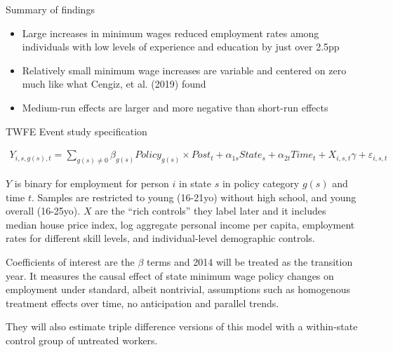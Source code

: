 \documentclass{beamer}
\begin{document}
\begin{frame}{Summary of findings}

\begin{itemize}
\item Large increases in minimum wages reduced employment rates among individuals with low levels of experience and education by just over 2.5pp
\item Relatively small minimum wage increases are variable and centered on zero much like what Cengiz, et al. (2019) found
\item Medium-run effects are larger and more negative than short-run effects
\end{itemize}

\end{frame}

\begin{frame}[shrink=20]{TWFE Event study specification}

\begin{eqnarray*}
Y_{i,s,g(s),t} = \sum_{g(s) \neq 0} \beta_{g(s)}Policy_{g(s)} \times Post_t + \alpha_{1s} State_s + \alpha_{2t} Time_t + X_{i,s,t} \gamma + \varepsilon_{i,s,t}
\end{eqnarray*}

\bigskip

$Y$ is binary for employment for person $i$ in state $s$ in policy category $g(s)$ and time $t$.  Samples are restricted to young (16-21yo) without high school, and young overall (16-25yo).  $X$ are the ``rich controls'' they label later and it includes median house price index, log aggregate personal income per capita, employment rates for different skill levels, and individual-level demographic controls.  

\bigskip

Coefficients of interest are the $\beta$ terms and 2014 will be treated as the transition year.  It measures the causal effect of state minimum wage policy changes on employment under standard, albeit nontrivial, assumptions such as homogenous treatment effects over time, no anticipation and parallel trends. 

\bigskip

They will also estimate triple difference versions of this model with a within-state control group of untreated workers.


\end{frame}


\end{document}

